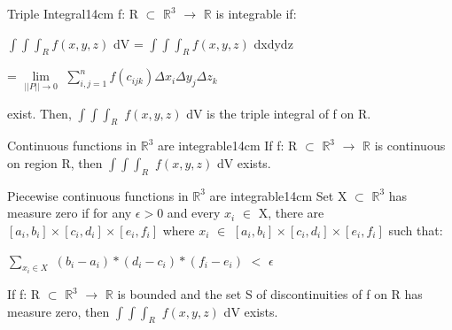     \begin{definition}{Triple Integral}{14cm}
        f: R $\subset$ $\mathbb{R}^3$ $\rightarrow$ $\mathbb{R}$
        is {\color{lblue} integrable} if:

        \hspace{0.5cm}
        $\int \int \int_R f(x,y,z)$ dV
        = $\int \int \int_R f(x,y,z)$ dxdydz

        \hspace{4.15cm}
        = $\underset{||P|| \rightarrow 0}{\lim}$
            $\sum_{i,j=1}^n f(c_{ijk}) \Delta x_i \Delta y_j \Delta z_k$

        exist. Then, $\int \int \int_R$ $f(x,y,z)$ dV
        is the {\color{lblue} triple integral} of f on R.
    \end{definition}

    \vspace{0.5cm}



    \begin{wtheorem}{Continuous functions in $\mathbb{R}^3$ are integrable}{14cm}
        If f: R $\subset$ $\mathbb{R}^3$ $\rightarrow$ $\mathbb{R}$
        is continuous on region R, then $\int \int \int_R$ $f(x,y,z)$ dV exists.
    \end{wtheorem}

    \vspace{0.5cm}



    \begin{wtheorem}{Piecewise continuous functions in $\mathbb{R}^3$
    are integrable}{14cm}
        Set X $\subset$ $\mathbb{R}^3$ has measure zero
        if for any $\epsilon > 0$ and every $x_i$ $\in$ X, there are
        $[a_i,b_i] \times [c_i,d_i] \times [e_i,f_i]$ where $x_i$ $\in$
        $[a_i,b_i] \times [c_i,d_i] \times [e_i,f_i]$ such that:

        \hspace{0.5cm}
        $\sum_{x_i \in X}$ $(b_i - a_i)*(d_i - c_i)*(f_i - e_i)$ $<$ $\epsilon$

        \vspace{0.3cm}
        
        If f: R $\subset$ $\mathbb{R}^3$ $\rightarrow$ $\mathbb{R}$
        is bounded and the set S of discontinuities of f on R
        has measure zero, then $\int \int \int_R$ $f(x,y,z)$ dV exists.
    \end{wtheorem}

    \vspace{0.5cm}



